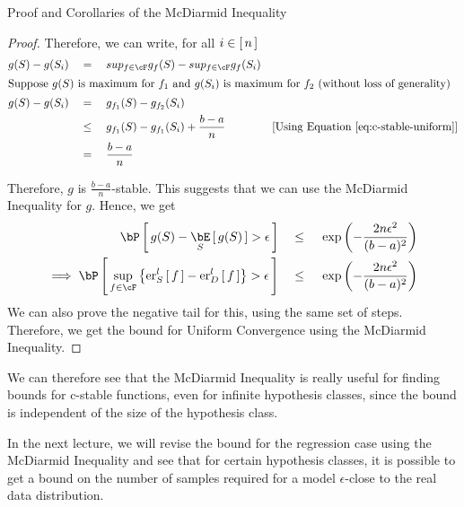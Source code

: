 \documentclass[11pt,a4paper]{article}
\begin{document}
\begin{ssection}{Proof and Corollaries of the McDiarmid Inequality}
\begin{proof}
			Therefore, we can write, for all $i \in \left[\,{n}\,\right]$
			\begin{align*}
				g(S) - g(S_i) & \eq	sup_{f \in \cF} g_f(S) - sup_{f \in \cF} g_f(S_i)                                             \\
				\intertext{Suppose $g(S)$ is maximum for $f_1$ and $g(S_i)$ is maximum for $f_2$ (without loss of generality)}
				g(S) - g(S_i) & \eq	g_{f_1}(S) - g_{f_2}(S_i)                                                                     \\
				              & \qle	g_{f_1}(S) - g_{f_1}(S_i) + \frac{b - a}{n} \mcmnt{Using Equation \ref{eq:c-stable-uniform}} \\
				              & \eq	\frac{b - a}{n}                                                                               
			\end{align*}
			
			Therefore, $g$ is $\frac{b-a}{n}$-stable. This suggests that we can use the McDiarmid Inequality for $g$. Hence, we get
			\begin{align*}
				\prob{g(S) - \E[S]{g(S)} > \epsilon}                                            & \qle	\texp{- \frac{2 n \epsilon^2}{(b - a)^2}} \\
				\implies \prob{\sup_{f \in \cF} \set{\err[_S^l]{f} - \err[_D^l]{f}} > \epsilon} & \qle	\texp{- \frac{2 n \epsilon^2}{(b - a)^2}} 
			\end{align*}
			We can also prove the negative tail for this, using the same set of steps. Therefore, we get the bound for Uniform Convergence using the McDiarmid Inequality.
		\end{proof}
		
		We can therefore see that the McDiarmid Inequality is really useful for finding bounds for c-stable functions, even for infinite hypothesis classes, since the bound is independent of the size of the hypothesis class.
		
		In the next lecture, we will revise the bound for the regression case using the McDiarmid Inequality and see that for certain hypothesis classes, it is possible to get a bound on the number of samples required for a model $\epsilon$-close to the real data distribution.
		
		\end{ssection}



	
\end{document}
